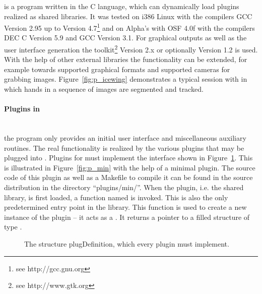 \icewing{} is a program written in the C language, which can
dynamically load plugins realized as shared libraries. It was tested on i386 Linux with the compilers GCC Version
2.95 up to Version 4.7\footnote{see http://gcc.gnu.org} and on
Alpha's with OSF 4.0f with the compilers DEC C Version 5.9 and GCC
Version 3.1. For graphical outputs as well as the user interface
generation the  toolkit\footnote{see http://www.gtk.org}
Version 2.x or optionally Version 1.2 is used. With the help of
other external libraries the functionality can be extended, for
example towards supported graphical formats and supported cameras
for grabbing images. Figure~\ref{fig:p_icewing} demonstrates a
typical session with \icewing{} in which hands in a sequence of
images are segmented and tracked.

\paragraph{Plugins in \icewing{}}\hfill\\

\icewing{} the program only provides an initial user interface and
miscellaneous auxiliary routines. The real functionality is realized
by the various plugins that may be plugged into \icewing{}. Plugins
for \icewing{} must implement the interface shown in
Figure~\ref{fig:p_plugdef}. This is illustrated in
Figure~\ref{fig:p_min} with the help of a minimal plugin. The source
code of this plugin as well as a Makefile to compile it can be found
in the \icewing{} source distribution in the directory
``plugins/min/''. When the plugin, i.e. the shared
library, is first loaded, a function named
 is invoked. This is also the only
predetermined entry point in the library. This function is used to
create a new instance of the plugin -- it acts as a . It returns a pointer to a filled structure of type
.

\begin{figure}[htb]
  \begin{center}
    \begin{small}
    \end{small}
  \end{center}
  \caption[The structure plugDefinition]
  {The structure plugDefinition, which every plugin must implement.}
  \label{fig:p_plugdef}
\end{figure}

